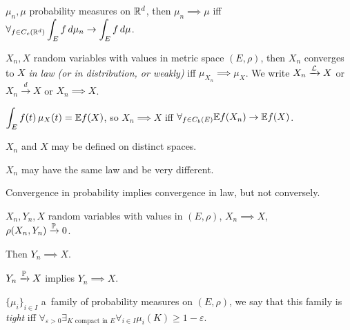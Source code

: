 	\begin{proposition}
		$\mu_n, \mu$ probability measures on $\R^d$, then $\mu_n \implies \mu$ iff \\ $ \displaystyle \forall_{f \in C_c(\R^d)} \int_E f\,d\mu_n \to \int_E f\,d\mu$.
	\end{proposition}
	
	\begin{definition}
		$X_n, X$ random variables with values in metric space $(E, \rho)$, then $X_n$ converges to $X$ \emph{in law (or in distribution, or weakly)} iff $\mu_{X_n} \implies \mu_X$. We write $X_n \xrightarrow{\mc{L}} X$ or $X_n \xrightarrow{d} X$ or $X_n \implies X$.
	\end{definition}
	
	\begin{remark}
		$\displaystyle \int_E f(t)\,\mu_X(t) = \E f(X)$, so $X_n \implies X$ iff $\displaystyle \forall_{f \in C_b(E)} \E f(X_n) \to \E f(X)$.
	\end{remark}
	
	\begin{remark}
		$X_n$ and $X$ may be defined on distinct spaces.
	\end{remark}
	
	\begin{remark}
		$X_n$ may have the same law and be very different.
	\end{remark}
	
	\begin{remark}
		Convergence in probability implies convergence in law, but not conversely.
	\end{remark}
	
	\begin{proposition}
		$X_n, Y_n, X$ random variables with values in $(E, \rho)$, $X_n \implies X$,\\ $\rho(X_n, Y_n) \xrightarrow{\P} 0$.
		
		Then $Y_n \implies X$.
	\end{proposition}
	
	\begin{corollary}
		$Y_n \xrightarrow{\P} X$ implies $Y_n \implies X$.
	\end{corollary}
	
	\begin{definition}
		$\{\mu_i\}_{i \in I}$ a~family of probability measures on $(E, \rho)$, we say that this family is \emph{tight} iff $\displaystyle \forall_{\varepsilon>0} \exists_{K\text{ compact in }E} \forall_{i \in I} \mu_i(K) \geq 1 - \varepsilon$.
	\end{definition}
	
